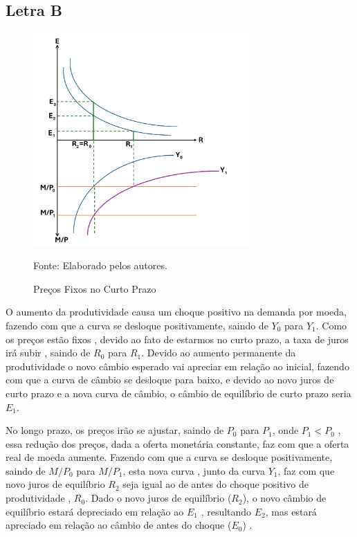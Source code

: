 \documentclass[a4paper,12pt]{article}[abntex2]
\begin{document}
\subsection{\textbf{Letra B}}
\begin{figure}[H]
    \centering
    \caption{Preços Fixos no Curto Prazo} 
    \includegraphics[width=0.75\textwidth]{Macroeconomia Internacional/APS 3 Macro Int/Preços Fixos no Curto Prazo.png}
    \label{fig:preçofixo}
    
    \footnotesize{Fonte: Elaborado pelos autores.}
    \end{figure}

O aumento da produtividade causa um choque positivo na demanda por moeda, fazendo com que  a curva se desloque positivamente, saindo de $Y_0$ para $Y_1$. Como os preços estão fixos , devido ao fato de estarmos no curto prazo, a taxa de juros irá subir , saindo de $R_0$ para $R_1$. Devido ao aumento permanente da produtividade o novo câmbio esperado vai apreciar em relação ao inicial, fazendo com que a curva de câmbio se desloque para baixo, e devido ao novo juros de curto prazo e a nova curva de câmbio, o câmbio de equilíbrio de curto prazo seria $E_1$.

No longo prazo, os preços irão se ajustar, saindo de $P_0$ para $P_1$, onde $P_1 < P_0$ , essa redução dos preços, dada a oferta monetária constante, faz com que a oferta real de moeda aumente. Fazendo com que a curva se desloque positivamente, saindo de $M/P_0$ para $M/P_1$, esta nova curva , junto da curva $Y_1$, faz com que novo juros de equilíbrio $R_2$ seja igual ao de antes do choque positivo de produtividade , $R_0$. Dado o novo juros de equilíbrio ($R_2$), o novo câmbio de equilíbrio estará depreciado em relação ao $E_1$ , resultando $E_2$, mas estará apreciado em relação ao câmbio de antes do choque ($E_0$) . 
\end{document}

